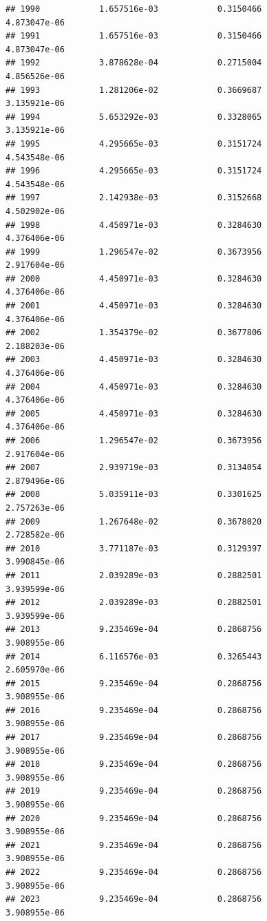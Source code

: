 \documentclass[
]{article}
\begin{document}
\begin{verbatim}
## 1990            1.657516e-03            0.3150466            4.873047e-06
## 1991            1.657516e-03            0.3150466            4.873047e-06
## 1992            3.878628e-04            0.2715004            4.856526e-06
## 1993            1.281206e-02            0.3669687            3.135921e-06
## 1994            5.653292e-03            0.3328065            3.135921e-06
## 1995            4.295665e-03            0.3151724            4.543548e-06
## 1996            4.295665e-03            0.3151724            4.543548e-06
## 1997            2.142938e-03            0.3152668            4.502902e-06
## 1998            4.450971e-03            0.3284630            4.376406e-06
## 1999            1.296547e-02            0.3673956            2.917604e-06
## 2000            4.450971e-03            0.3284630            4.376406e-06
## 2001            4.450971e-03            0.3284630            4.376406e-06
## 2002            1.354379e-02            0.3677806            2.188203e-06
## 2003            4.450971e-03            0.3284630            4.376406e-06
## 2004            4.450971e-03            0.3284630            4.376406e-06
## 2005            4.450971e-03            0.3284630            4.376406e-06
## 2006            1.296547e-02            0.3673956            2.917604e-06
## 2007            2.939719e-03            0.3134054            2.879496e-06
## 2008            5.035911e-03            0.3301625            2.757263e-06
## 2009            1.267648e-02            0.3678020            2.728582e-06
## 2010            3.771187e-03            0.3129397            3.990845e-06
## 2011            2.039289e-03            0.2882501            3.939599e-06
## 2012            2.039289e-03            0.2882501            3.939599e-06
## 2013            9.235469e-04            0.2868756            3.908955e-06
## 2014            6.116576e-03            0.3265443            2.605970e-06
## 2015            9.235469e-04            0.2868756            3.908955e-06
## 2016            9.235469e-04            0.2868756            3.908955e-06
## 2017            9.235469e-04            0.2868756            3.908955e-06
## 2018            9.235469e-04            0.2868756            3.908955e-06
## 2019            9.235469e-04            0.2868756            3.908955e-06
## 2020            9.235469e-04            0.2868756            3.908955e-06
## 2021            9.235469e-04            0.2868756            3.908955e-06
## 2022            9.235469e-04            0.2868756            3.908955e-06
## 2023            9.235469e-04            0.2868756            3.908955e-06

\end{verbatim}
\end{document}
